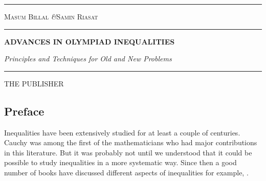 \documentclass[a4paper, 12pt, leqno, twoside]{book}
\theoremstyle{definition}
\numberwithin{problem}{chapter}
\begin{document}
	\frontmatter
	\begin{titlepage}
		\pagecolor{splashedwhite}
		\txtheight
		\begin{minipage}[t]{0.05\txtwidth}
			\color{black}
			\rule{6pt}{\txtheight}
		\end{minipage}
		\hspace{0.05\txtwidth}
		\begin{minipage}[t]{2\txtwidth}
			\color{smokyblack}
			\vspace*{\drop}
			{\Large {\scshape Masum Billal} \quad\textit{\&}\quad \textsc{Samin Riasat}} \\
			\rule{1\txtwidth}{1pt} \par
			\vspace{3\baselineskip}
			{\noindent\bfseries ADVANCES IN OLYMPIAD INEQUALITIES} \par
			\vspace{2\baselineskip}
			{\large\itshape Principles and Techniques for Old and New Problems} \par
			\vspace{6.5\baselineskip}
			{\scshape } \par
			\vspace{0.1\baselineskip}
			{\Large } \par
			\vspace{\baselineskip}
			\rule{\txtwidth}{1pt} \par
			\vspace{\baselineskip}
			{\Large THE PUBLISHER}
		\end{minipage}
		\hfill
	\end{titlepage}

	\begin{refsection}
		\section*{Preface}
		
		Inequalities have been extensively studied for at least a couple of centuries. Cauchy was among the first of the mathematicians who had major contributions in this literature. But it was probably not until \textcite{hardy_littlewood_polya_1934} we understood that it could be possible to study inequalities in a more systematic way. Since then a good number of books have discussed different aspects of inequalities for example, \textcite{beckenbach_bellman_1983}. 
		\printbibliography
	\end{refsection}
	\tableofcontents
	\mainmatter
\end{document}
